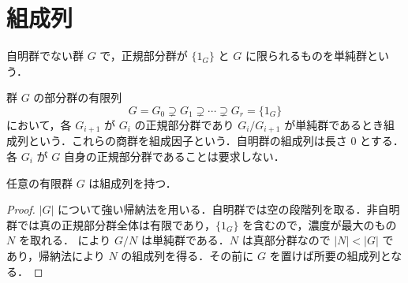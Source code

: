 \section{組成列}
\begin{defn}[単純群]
自明群でない群 $G$ で，正規部分群が $\{1_G\}$ と $G$ に限られるものを単純群という．
\end{defn}
\begin{defn}[組成列]
群 $G$ の部分群の有限列
\[
 G=G_0\supsetneq G_1\supsetneq\cdots\supsetneq G_r=\{1_G\}
\]
において，各 $G_{i+1}$ が $G_i$ の正規部分群であり $G_i/G_{i+1}$ が単純群であるとき組成列という．これらの商群を組成因子という．自明群の組成列は長さ $0$ とする．各 $G_i$ が $G$ 自身の正規部分群であることは要求しない．
\end{defn}
\begin{prop}[有限群の組成列の存在]
任意の有限群 $G$ は組成列を持つ．
\end{prop}
\begin{proof}
$|G|$ について強い帰納法を用いる．自明群では空の段階列を取る．非自明群では真の正規部分群全体は有限であり，$\{1_G\}$ を含むので，濃度が最大のもの $N$ を取れる． により $G/N$ は単純群である．$N$ は真部分群なので $|N|<|G|$ であり，帰納法により $N$ の組成列を得る．その前に $G$ を置けば所要の組成列となる．
\end{proof}
